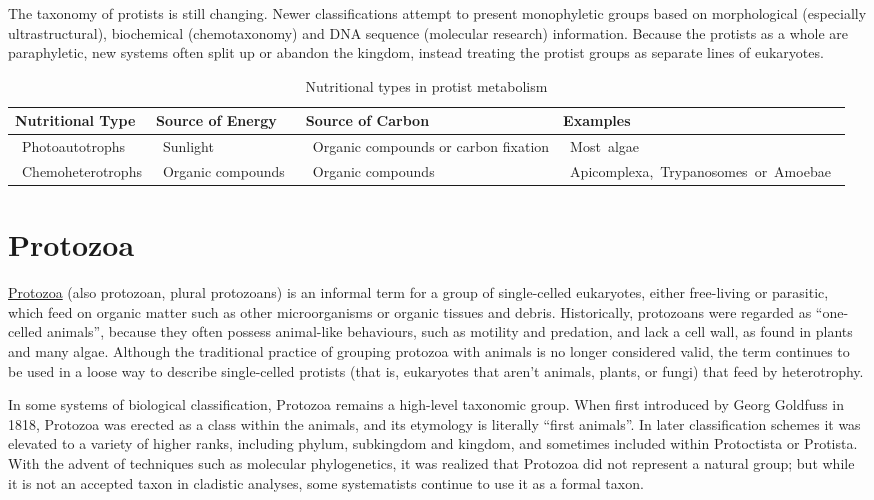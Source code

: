 The taxonomy of protists is still changing. Newer classifications attempt to present monophyletic groups based on morphological (especially ultrastructural), biochemical (chemotaxonomy) and DNA sequence (molecular research) information. Because the protists as a whole are paraphyletic, new systems often split up or abandon the kingdom, instead treating the protist groups as separate lines of eukaryotes.

\onecolumn
\begin{table}
\caption{\label{tab:protistmetabo}Nutritional types in protist metabolism}
\centering
\begin{tabular}[t]{>{\raggedright\arraybackslash}p{10em}>{\raggedright\arraybackslash}p{20em}>{\raggedright\arraybackslash}p{15em}>{\raggedright\arraybackslash}p{20em}}
\toprule
Nutritional Type & Source of Energy & Source of Carbon & Examples\\
\midrule
\rowcolor{gray!6}   Photoautotrophs  &  Sunlight  &  Organic compounds or carbon fixation &  Most algae \\
 Chemoheterotrophs &  Organic compounds  &  Organic compounds  &  Apicomplexa, Trypanosomes or Amoebae \\
\bottomrule
\end{tabular}
\end{table}

\twocolumn

\hypertarget{protozoa}{%
\section{Protozoa}\label{protozoa}}

\href{https://en.wikipedia.org/wiki/Protozoa}{Protozoa} (also protozoan, plural protozoans) is an informal term for a group of single-celled eukaryotes, either free-living or parasitic, which feed on organic matter such as other microorganisms or organic tissues and debris. Historically, protozoans were regarded as ``one-celled animals'', because they often possess animal-like behaviours, such as motility and predation, and lack a cell wall, as found in plants and many algae. Although the traditional practice of grouping protozoa with animals is no longer considered valid, the term continues to be used in a loose way to describe single-celled protists (that is, eukaryotes that aren't animals, plants, or fungi) that feed by heterotrophy.

In some systems of biological classification, Protozoa remains a high-level taxonomic group. When first introduced by Georg Goldfuss in 1818, Protozoa was erected as a class within the animals, and its etymology is literally ``first animals''. In later classification schemes it was elevated to a variety of higher ranks, including phylum, subkingdom and kingdom, and sometimes included within Protoctista or Protista. With the advent of techniques such as molecular phylogenetics, it was realized that Protozoa did not represent a natural group; but while it is not an accepted taxon in cladistic analyses, some systematists continue to use it as a formal taxon.

